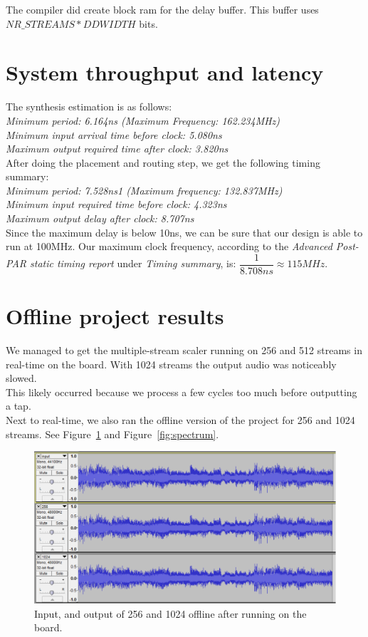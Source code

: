 \documentclass[a4paper,twoside,11pt, fleqn]{article}
\begin{document}
The compiler did create block ram for the delay buffer. This buffer uses $NR\_STREAMS * DDWIDTH$ bits.

\newpage
\section{System throughput and latency}
The synthesis estimation is as follows:\\

\textit{Minimum period: 6.164ns (Maximum Frequency: 162.234MHz)\\
Minimum input arrival time before clock: 5.080ns\\
Maximum output required time after clock: 3.820ns}\\

After doing the placement and routing step, we get the following timing summary:\\

\textit{Minimum period:   7.528ns{1}   (Maximum frequency: 132.837MHz)\\
Minimum input required time before clock:   4.323ns\\
Maximum output delay after clock:   8.707ns}\\

Since the maximum delay is below 10ns, we can be sure that our design is able to run at 100MHz. Our maximum clock frequency, according to the \textit{Advanced Post-PAR static timing report} under \textit{Timing summary}, is: $\dfrac{1}{8.708ns} \approx 115MHz$. 
   
\newpage
\section{Offline project results}
We managed to get the multiple-stream scaler running on 256 and 512 streams in real-time on the board. With 1024 streams the output audio was noticeably slowed. \\ This likely occurred because we process a few cycles too much before outputting a tap. \\

Next to real-time, we also ran the offline version of the project for 256 and 1024 streams. See Figure~\ref{fig:output} and Figure~\ref{fig:spectrum}.
\begin{figure}[h]
	\centering
	\includegraphics[scale = 0.6]{Images/output_offline.png}
    \caption{Input, and output of 256 and 1024 offline after running on the board.}
    \label{fig:output}
\end{figure}
\end{document}
